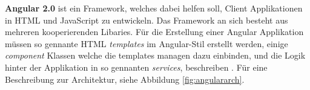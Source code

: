 \textbf{Angular 2.0} ist ein Framework, welches dabei helfen soll, Client Applikationen in HTML und JavaScript zu entwickeln. Das Framework an sich besteht aus mehreren kooperierenden Libaries. Für die Erstellung einer Angular Applikation müssen so gennante HTML \textit{templates} im Angular-Stil erstellt werden, einige \textit{component} Klassen welche die templates managen dazu einbinden, und die Logik hinter der Applikation in so gennanten \textit{services}, beschreiben \cite{MELD.CH3-web-app.angular}. Für eine Beschreibung zur Architektur, siehe Abbildung \ref{fig:angulararch}.

\clearpage
{}

\begin{table}[!htb]
\centering
{}
\end{table}
